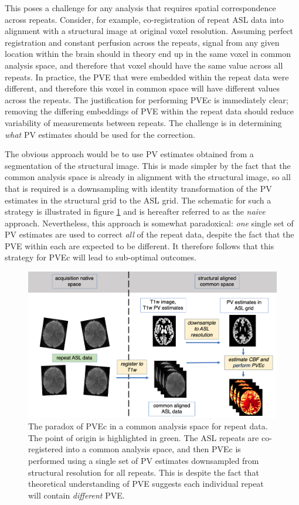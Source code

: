 \documentclass[12pt]{report}
\begin{document}
This poses a challenge for any analysis that requires spatial correspondence across repeats. Consider, for example, co-registration of repeat ASL data into alignment with a structural image at original voxel resolution. Assuming perfect registration and constant perfusion across the repeats, signal from any given location within the brain should in theory end up in the same voxel in common analysis space, and therefore that voxel should have the same value across all repeats. In practice, the PVE that were embedded within the repeat data were different, and therefore this voxel in common space will have different values across the repeats. The justification for performing PVEc is immediately clear; removing the differing embeddings of PVE within the repeat data should reduce variability of measurements between repeats. The challenge is in determining \textit{what} PV estimates should be used for the correction. 

The obvious approach would be to use PV estimates obtained from a segmentation of the structural image. This is made simpler by the fact that the common analysis space is already in alignment with the structural image, so all that is required is a downsampling with identity transformation of the PV estimates in the structural grid to the ASL grid. The schematic for such a strategy is illustrated in figure \ref{rpt_paradox} and is hereafter referred to as the \textit{naive} approach. Nevertheless, this approach is somewhat paradoxical: \textit{one} single set of PV estimates are used to correct \textit{all} of the repeat data, despite the fact that the PVE within each are expected to be different. It therefore follows that this strategy for PVEc will lead to sub-optimal outcomes. 

\begin{figure}
\centering
\includegraphics[width = \textwidth]{rpt_paradox.png}
\caption{The paradox of PVEc in a common analysis space for repeat data. The point of origin is highlighted in green. The ASL repeats are co-registered into a common analysis space, and then PVEc is performed using a single set of PV estimates downsampled from structural resolution for all repeats. This is despite the fact that theoretical understanding of PVE suggests each individual repeat will contain \textit{different} PVE.}
\label{rpt_paradox}
\end{figure}
\end{document}
